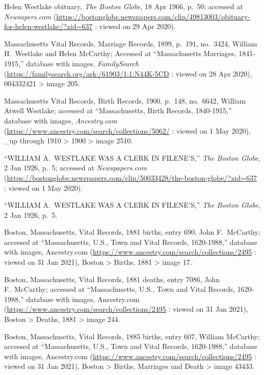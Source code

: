 \begin{thebibliography}{999}
Helen Westlake obituary, \textit{The Boston Globe}, 18 Apr 1966, p.\ 50; accessed at \textit{Newsapers.com} (\url{https://bostonglobe.newspapers.com/clip/49813003/obituary-for-helen-westlake/?xid=637} : viewed on 29 Apr 2020).

Massachusetts Vital Records, Marriage Records, 1899, p.\ 191, no.\ 3424, William H.\ Westlake and Helen McCarthy; Accessed at ``Massachusetts Marriages, 1841-1915,'' database with images, \textit{FamilySearch} (\url{https://familysearch.org/ark:/61903/1:1:N44K-5CD} : viewed on 28 Apr 2020), 004332421 > image 205.

Massachusetts Vital Records, Birth Records, 1900, p.\ 148, no.\ 6642, William Atwell Westlake; accessed at ``Massachusetts, Birth Records, 1840-1915,'' database with images, \textit{Ancestry.com} (\url{https://www.ancestry.com/search/collections/5062/} : viewed on 1 May 2020), \_up through 1910 > 1900 > image 2510.

``WILLIAM A.\ WESTLAKE WAS A CLERK IN FILENE'S,'' \textit{The Boston Globe}, 2 Jan 1926, p.\ 5; accessed at \textit{Newspapers.com} (\url{https://bostonglobe.newspapers.com/clip/50033428/the-boston-globe/?xid=637} : viewed on 1 May 2020).

``WILLIAM A.\ WESTLAKE WAS A CLERK IN FILENE'S,'' \textit{The Boston Globe}, 2 Jan 1926, p.\ 5.

Boston, Massachusetts, Vital Records, 1881 births, entry 690, John F.\ McCarthy; accessed at ``Massachusetts, U.S., Town and Vital Records, 1620-1988,'' database with images, Ancestry.com (\url{https://www.ancestry.com/search/collections/2495} : viewed on 31 Jan 2021), Boston > Births, 1881 > image 17.

Boston, Massachusetts, Vital Records, 1881 deaths, entry 7086, John F.\ McCarthy; accessed at ``Massachusetts, U.S., Town and Vital Records, 1620-1988,'' database with images, Ancestry.com (\url{https://www.ancestry.com/search/collections/2495} : viewed on 31 Jan 2021), Boston > Deaths, 1881 > image 244.

Boston, Massachusetts, Vital Records, 1885 births, entry 607, William McCarthy; accessed at ``Massachusetts, U.S., Town and Vital Records, 1620-1988,'' database with images, Ancestry.com (\url{https://www.ancestry.com/search/collections/2495} : viewed on 31 Jan 2021), Boston > Births, Marriages and Death > image 43433.


\end{thebibliography}
